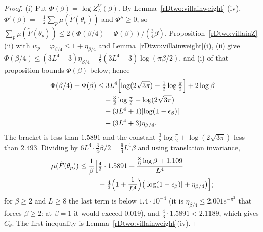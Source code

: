 \begin{proof}
(i) Put $\Phi(\beta)=\log Z^V_L(\beta)$. By Lemma~\ref{rDtwo:villainweight}
(iv), $\Phi'(\beta)=-\frac12\sum_p\mu(\tilde F(\theta_p))$ and $\Phi''\ge0$,
so $\sum_p\mu(\tilde F(\theta_p))\le2(\Phi(\beta/4)-\Phi(\beta))/(\frac34
\beta)$. Proposition~\ref{rDtwo:villainZ}(ii) with $w_p=\varphi_{\beta/4}\le
1+\eta_{\beta/4}$ and Lemma~\ref{rDtwo:villainweight}(i), (ii) give $\Phi(
\beta/4)\le(3L^4+3)\eta_{\beta/4}-\frac12(3L^4-3)\log(\pi\beta/2)$, and (i)
of that proposition bounds $\Phi(\beta)$ below; hence
\[
\begin{split}
\Phi(\beta/4)-\Phi(\beta)&\le3L^4\Bigl[\log(2\sqrt{3\pi})-\tfrac12\log
\tfrac\pi2\Bigr]+2\log\beta\\
&\quad+\tfrac32\log\tfrac\pi2+\log(2\sqrt{3\pi})\\
&\quad+(3L^4+1)\lvert\log(1-\epsilon_\beta)\rvert\\
&\quad+(3L^4+3)\eta_{\beta/4}.
\end{split}
\]
The bracket is less than $1.5891$ and the constant $\frac32\log\frac\pi2+
\log(2\sqrt{3\pi})$ less than $2.493$. Dividing by $6L^4\cdot\frac34\beta/2=
\frac94L^4\beta$ and using translation invariance,
\[
\begin{split}
\mu(\tilde F(\theta_p))\le\frac1\beta\Bigl[&\tfrac43\cdot1.5891+\frac{\frac89
\log\beta+1.109}{L^4}\\
&+\tfrac43\Bigl(1+\frac1{L^4}\Bigr)\bigl(\lvert\log(1-\epsilon_\beta)\rvert
+\eta_{\beta/4}\bigr)\Bigr];
\end{split}
\]
for $\beta\ge2$ and $L\ge8$ the last term is below $1.4\cdot10^{-4}$ (it is
$\eta_{\beta/4}\le2.001e^{-\pi^2}$ that forces $\beta\ge2$: at $\beta=1$ it
would exceed $0.019$), and $\frac43\cdot1.5891<2.1189$, which gives
$C_\theta$. The first inequality is Lemma~\ref{rDtwo:villainweight}(iv).


\end{proof}
